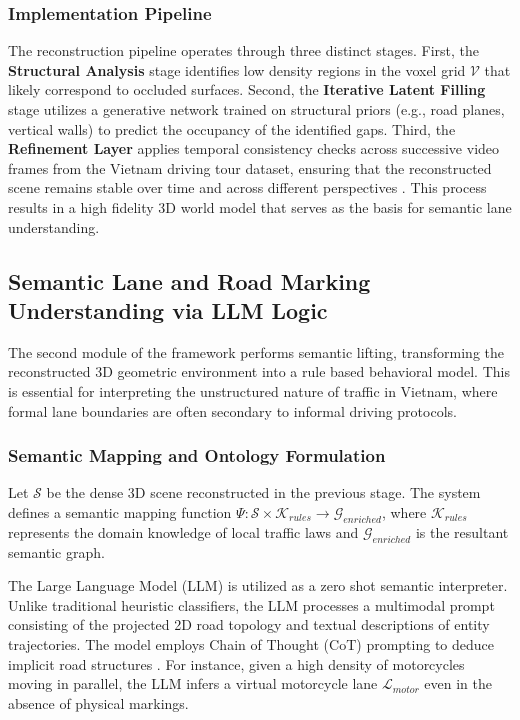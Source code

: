 \documentclass[a4paper, 12pt]{article}
\begin{document}
	\subsubsection{Implementation Pipeline}
	The reconstruction pipeline operates through three distinct stages. First, the \textbf{Structural Analysis} stage identifies low density regions in the voxel grid $\mathcal{V}$ that likely correspond to occluded surfaces. Second, the \textbf{Iterative Latent Filling} stage utilizes a generative network trained on structural priors (e.g., road planes, vertical walls) to predict the occupancy of the identified gaps. Third, the \textbf{Refinement Layer} applies temporal consistency checks across successive video frames from the Vietnam driving tour dataset, ensuring that the reconstructed scene remains stable over time and across different perspectives \cite{roadscene2vec2024, vo2021density}. This process results in a high fidelity 3D world model that serves as the basis for semantic lane understanding.
	\subsection{Semantic Lane and Road Marking Understanding via LLM Logic}
	The second module of the framework performs semantic lifting, transforming the reconstructed 3D geometric environment into a rule based behavioral model. This is essential for interpreting the unstructured nature of traffic in Vietnam, where formal lane boundaries are often secondary to informal driving protocols.
	
	\subsubsection{Semantic Mapping and Ontology Formulation}
	Let $\mathcal{S}$ be the dense 3D scene reconstructed in the previous stage. The system defines a semantic mapping function $\Psi: \mathcal{S} \times \mathcal{K}_{rules} \rightarrow \mathcal{G}_{enriched}$, where $\mathcal{K}_{rules}$ represents the domain knowledge of local traffic laws and $\mathcal{G}_{enriched}$ is the resultant semantic graph.
	
	The Large Language Model (LLM) is utilized as a zero shot semantic interpreter. Unlike traditional heuristic classifiers, the LLM processes a multimodal prompt consisting of the projected 2D road topology and textual descriptions of entity trajectories. The model employs Chain of Thought (CoT) prompting to deduce implicit road structures \cite{wei2022cot}. For instance, given a high density of motorcycles moving in parallel, the LLM infers a virtual motorcycle lane $\mathcal{L}_{motor}$ even in the absence of physical markings.
	
\end{document}
